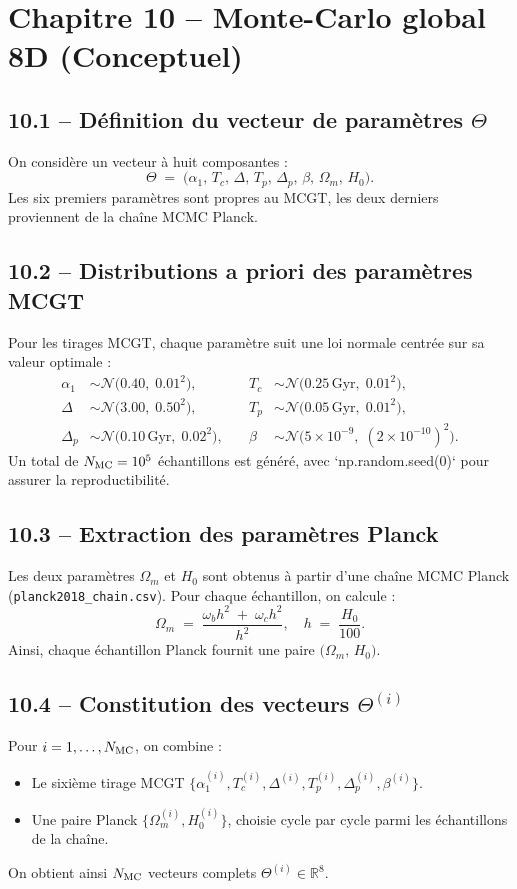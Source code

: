 \section{Chapitre 10 – Monte-Carlo global 8D (Conceptuel)}

\subsection{10.1 – Définition du vecteur de paramètres \(\Theta\)}
On considère un vecteur à huit composantes :
\[
  \Theta \;=\; 
  \bigl(\alpha_{1},\,T_{c},\,\Delta,\,T_{p},\,\Delta_{p},\,\beta,\,
           \Omega_{m},\,H_{0}\bigr).
\]
Les six premiers paramètres sont propres au MCGT, les deux derniers proviennent de la chaîne MCMC Planck.

\subsection{10.2 – Distributions a priori des paramètres MCGT}
Pour les tirages MCGT, chaque paramètre suit une loi normale centrée sur sa valeur optimale :
\[
  \begin{aligned}
    \alpha_{1} &\sim \mathcal{N}\bigl(0.40,\;0.01^{2}\bigr), 
    &\quad
    T_{c} &\sim \mathcal{N}\bigl(0.25\,\text{Gyr},\;0.01^{2}\bigr), \\
    \Delta &\sim \mathcal{N}\bigl(3.00,\;0.50^{2}\bigr), 
    &\quad
    T_{p} &\sim \mathcal{N}\bigl(0.05\,\text{Gyr},\;0.01^{2}\bigr), \\
    \Delta_{p} &\sim \mathcal{N}\bigl(0.10\,\text{Gyr},\;0.02^{2}\bigr),
    &\quad
    \beta &\sim \mathcal{N}\bigl(5\times10^{-9},\;(2\times10^{-10})^{2}\bigr).
  \end{aligned}
\]
Un total de \(N_{\rm MC}=10^{5}\) échantillons est généré, avec `np.random.seed(0)` pour assurer la reproductibilité.

\subsection{10.3 – Extraction des paramètres Planck}
Les deux paramètres \(\Omega_{m}\) et \(H_{0}\) sont obtenus à partir d’une chaîne MCMC Planck (\texttt{planck2018\_chain.csv}). Pour chaque échantillon, on calcule :
\[
  \Omega_{m} \;=\; \frac{\omega_{b} h^{2} \;+\;\omega_{c} h^{2}}{h^{2}},
  \quad
  h \;=\; \frac{H_{0}}{100}.
\]
Ainsi, chaque échantillon Planck fournit une paire \(\bigl(\Omega_{m},\,H_{0}\bigr)\).

\subsection{10.4 – Constitution des vecteurs \(\Theta^{(i)}\)}
Pour \(i=1,\dots,N_{\rm MC}\), on combine :
\begin{itemize}
  \item Le sixième tirage MCGT \(\{\alpha_{1}^{(i)},T_{c}^{(i)},\Delta^{(i)},T_{p}^{(i)},\Delta_{p}^{(i)},\beta^{(i)}\}\).
  \item Une paire Planck \(\{\Omega_{m}^{(i)},H_{0}^{(i)}\}\), choisie cycle par cycle parmi les échantillons de la chaîne.
\end{itemize}
On obtient ainsi \(N_{\rm MC}\) vecteurs complets \(\Theta^{(i)} \in \mathbb{R}^{8}\).

